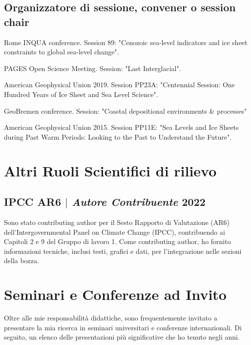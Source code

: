 \documentclass[11pt]{article}
\begin{document}
{\normalfont 
\subsection{Organizzatore di sessione, convener o session chair}}
{\footnotesize
\begin{description}
  \item [2023] Rome INQUA conference. Session 89: "Cenozoic sea-level indicators and ice sheet constraints to global sea-level change".
  \item [2022] PAGES Open Science Meeting. Session: "Last Interglacial".
  \item [2019] American Geophysical Union 2019. Session PP23A: "Centennial Session: One Hundred Years of Ice Sheet and Sea Level Science".
  \item [2017] GeoBremen conference. Session: "Coastal depositional environments \& processes"
  \item [2015] American Geophysical Union 2015. Session PP11E: "Sea Levels and Ice Sheets during Past Warm Periods: Looking to the Past to Understand the Future".
  \item \end{description}}

\section{Altri Ruoli Scientifici di rilievo}
\subsection{IPCC AR6 $|$ {\normalfont\textit{Autore Contribuente}} \hfill 2022}
{\footnotesize Sono stato contributing author per il Sesto Rapporto di Valutazione (AR6) dell'Intergovernmental Panel on Climate Change (IPCC), contribuendo ai Capitoli 2 e 9 del Gruppo di lavoro 1. Come contributing author, ho fornito informazioni tecniche, inclusi testi, grafici e dati, per l'integrazione nelle sezioni della bozza.}

\section{Seminari e Conferenze ad Invito}
{\normalfont Oltre alle mie responsabilità didattiche, sono frequentemente invitato a presentare la mia ricerca in seminari universitari e conferenze internazionali. Di seguito, un elenco delle presentazioni più significative che ho tenuto negli anni.}
\end{document}
